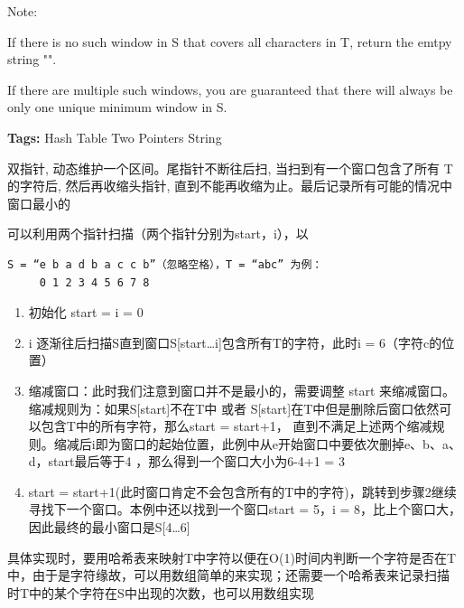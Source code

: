 \documentclass[12pt]{book}
\begin{document}
Note:

If there is no such window in S that covers all characters in T, return the emtpy string "".

If there are multiple such windows, you are guaranteed that there will always be only one unique minimum window in S.

\textbf{Tags:} Hash Table Two Pointers String

双指针, 动态维护一个区间。尾指针不断往后扫, 当扫到有一个窗口包含了所有 T 的字符后, 
然后再收缩头指针, 直到不能再收缩为止。最后记录所有可能的情况中窗口最小的

可以利用两个指针扫描（两个指针分别为start，i），以
\lstset{language=java,label= ,caption= ,numbers=none}
\begin{lstlisting}
S = “e b a d b a c c b”（忽略空格），T = “abc” 为例：
     0 1 2 3 4 5 6 7 8
\end{lstlisting}

\begin{enumerate}
\item 初始化 start = i = 0

\item i 逐渐往后扫描S直到窗口S[start…i]包含所有T的字符，此时i = 6（字符c的位置）

\item 缩减窗口：此时我们注意到窗口并不是最小的，需要调整 start 来缩减窗口。缩减规则为：如果S[start]不在T中 或者 S[start]在T中但是删除后窗口依然可以包含T中的所有字符，那么start = start+1， 直到不满足上述两个缩减规则。缩减后i即为窗口的起始位置，此例中从e开始窗口中要依次删掉e、b、a、d，start最后等于4 ，那么得到一个窗口大小为6-4+1 = 3

\item start = start+1(此时窗口肯定不会包含所有的T中的字符)，跳转到步骤2继续寻找下一个窗口。本例中还以找到一个窗口start = 5，i = 8，比上个窗口大，因此最终的最小窗口是S[4…6]
\end{enumerate}

具体实现时，要用哈希表来映射T中字符以便在O(1)时间内判断一个字符是否在T
中，由于是字符缘故，可以用数组简单的来实现；还需要一个哈希表来记录扫描
时T中的某个字符在S中出现的次数，也可以用数组实现
\end{document}
